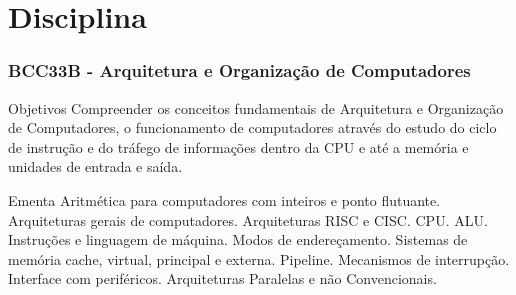 \documentclass{beamer}
\begin{document}
\section[Disciplina]{Disciplina}
\begin{frame}
	\frametitle{BCC33B - Arquitetura e Organização de Computadores}
	\fontsize{14pt}{7.2}\selectfont
	\begin{minipage}[t][\textheight][t]{\textwidth}
	\begin{exampleblock}{Objetivos}
		\fontsize{12pt}{7.2}\selectfont
		Compreender os conceitos fundamentais de Arquitetura e Organização de Computadores, o funcionamento de computadores através do estudo do ciclo de instrução e do tráfego de informações dentro da CPU e até a memória e unidades de entrada e saída.
	\end{exampleblock}
	\begin{alertblock}{Ementa}
		\fontsize{12pt}{7.2}\selectfont
		Aritmética para computadores com inteiros e ponto flutuante. Arquiteturas gerais de computadores. Arquiteturas RISC e CISC. CPU. ALU. Instruções e linguagem de máquina. Modos de endereçamento. Sistemas de memória cache, virtual, principal e externa. Pipeline. Mecanismos de interrupção. Interface com periféricos. Arquiteturas Paralelas e não Convencionais.
	\end{alertblock}
	\end{minipage}
\end{frame}
\end{document}
